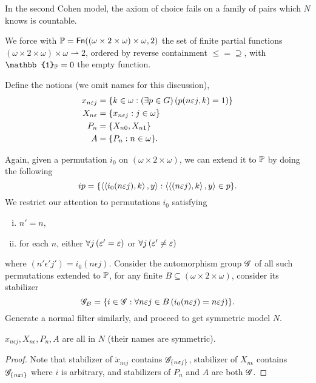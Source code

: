 In the second Cohen model, the axiom of choice fails on a family of pairs which \(N\) knows is countable.


We force with \(\mathbb{P} = \Fn((\omega\times 2 \times\omega)\times\omega, 2)\)
the set of finite partial functions \((\omega\times 2 \times\omega)\times\omega \rightharpoonup 2\),
ordered by reverse containment \(\leq = \supseteq\),
with \(\mathbb{1}_\P = 0\) the empty function.

Define the notions (we omit names for this discussion),
\begin{align*}
    x_{n\epsilon j} &= \set{k\in\omega: \left(\exists p\in G\right) \left(p(n\epsilon j, k) = 1\right) }\\
    X_{n\epsilon} &= \set{x_{n\epsilon j}: j\in\omega}\\
    P_n &= \set{X_{n0}, X_{n1}}\\
    A &= \set{P_n:n\in\omega}.
\end{align*}

Again, given a permutation \(i_0\) on \((\omega\times2\times\omega)\), we can extend it to \(\P\) by doing the following
\[i p = \set{ \Angle{\Angle{i_0(n\epsilon j), k}, y}: \Angle{\Angle{(n\epsilon j),k}, y} \in p }.\]
We restrict our attention to permutations \(i_0\) satisfying
\begin{enumerate}[i.]
    \item \(n' = n\),
    \item for each \(n\), either \(\forall j\paren{\epsilon' = \epsilon}\) or \(\forall j\paren{\epsilon' \ne \epsilon}\)
\end{enumerate}
where \((n'\epsilon' j') = i_0(n\epsilon j)\).
Consider the automorphism group \(\G\) of all such permutations extended to \(\P\),
for any finite \(B\subseteq (\omega\times2\times\omega)\), consider its stabilizer
\[ \G_B = \set{ i\in \G: \forall n\epsilon j\in B\left( i_0(n\epsilon j) = n\epsilon j \right) }. \]
Generate a normal filter similarly, and proceed to get symmetric model \(N\).


\begin{proposition}
    \(x_{n\epsilon j}, X_{n\epsilon}, P_n, A\) are all in \(N\) (their names are symmetric).
\end{proposition}
\begin{proof}
    Note that stabilizer of \(\mathring{x}_{n\epsilon j}\) contains \(\G_{\set{n\epsilon j}}\),
    stabilizer of \(X_{n\epsilon}\) contains \(\G_{\set{n\epsilon i}}\) where \(i\) is arbitrary,
    and stabilizers of \(P_n\) and \(A\) are both \(\G\).
\end{proof}

